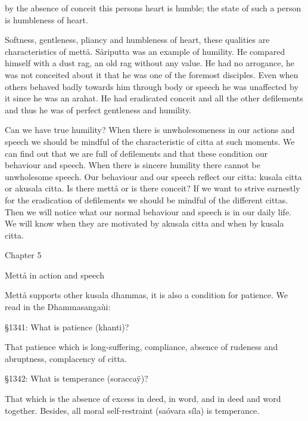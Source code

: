 \documentclass[12pt,twoside]{article}
\begin{document}
\bigskip

{\textasciigrave}{\textasciigrave}by the absence of conceit this
person{\textquotesingle}s heart is humble; the state of such a person
is humbleness of heart.{\textquotesingle}{\textquotesingle}


\bigskip

Softness, gentleness, pliancy and humbleness of heart, these qualities
are characteristics of mett{\aa}. S{\aa}riputta was an example of
humility. He compared himself with a dust rag, an old rag without any
value. He had no arrogance, he was not conceited about it that he was
one of the foremost disciples. Even when others behaved badly towards
him through body or speech he was unaffected by it since he was an
arahat. He had eradicated conceit and all the other defilements and
thus he was of perfect gentleness and humility. 

Can we have true humility? When there is unwholesomeness in our actions
and speech we should be mindful of the characteristic of citta at such
moments. We can find out that we are full of defilements and that these
condition our behaviour and speech. When there is sincere humility
there cannot be unwholesome speech. Our behaviour and our speech
reflect our citta: kusala citta or akusala citta. Is there mett{\aa} or
is there conceit? If we want to strive earnestly for the eradication of
defilements we should be mindful of the different cittas. Then we will
notice what our normal behaviour and speech is in our daily life. We
will know when they are motivated by akusala citta and when by kusala
citta. 


\bigskip

\clearpage
Chapter 5


\bigskip


\bigskip

Mett{\aa} in action and speech


\bigskip


\bigskip

Mett{\aa} supports other kusala dhammas, it is also a condition for
patience. We read in the Dhammasanga\`ui:


\bigskip

{\S}1341: What is patience (khanti)?

That patience which is long{}-suffering, compliance, absence of rudeness
and abruptness, complacency of citta. 

{\S}1342: What is temperance (soracca\"y)?

That which is the absence of excess in deed, in word, and in deed and
word together. Besides, all moral self{}-restraint (sa\'ovara s\'ila)
is temperance. 
\end{document}
